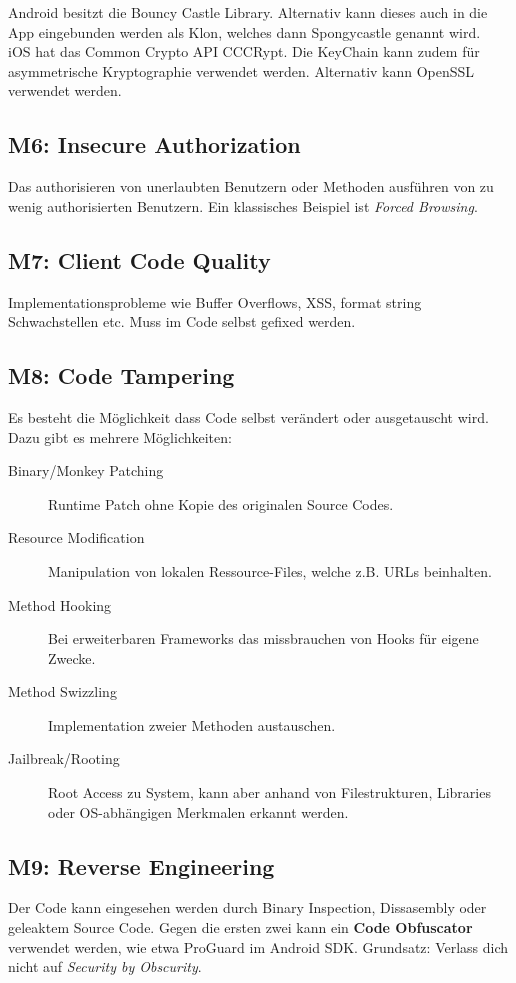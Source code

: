 Android besitzt die Bouncy Castle Library. Alternativ kann dieses auch in die App eingebunden werden als Klon, welches dann Spongycastle genannt wird.\\

iOS hat das Common Crypto API CCCRypt. Die KeyChain kann zudem für asymmetrische Kryptographie verwendet werden. Alternativ kann OpenSSL verwendet werden.

\subsection{M6: Insecure Authorization}
Das authorisieren von unerlaubten Benutzern oder Methoden ausführen von zu wenig authorisierten Benutzern. Ein klassisches Beispiel ist \textit{Forced Browsing}.

\subsection{M7: Client Code Quality}
Implementationsprobleme wie Buffer Overflows, XSS, format string Schwachstellen etc. Muss im Code selbst gefixed werden.

\subsection{M8: Code Tampering}
Es besteht die Möglichkeit dass Code selbst verändert oder ausgetauscht wird. Dazu gibt es mehrere Möglichkeiten:

\begin{description}
	\item[Binary/Monkey Patching] Runtime Patch ohne Kopie des originalen Source Codes.
	\item[Resource Modification] Manipulation von lokalen Ressource-Files, welche z.B. URLs beinhalten.
	\item[Method Hooking] Bei erweiterbaren Frameworks das missbrauchen von Hooks für eigene Zwecke.
	\item[Method Swizzling] Implementation zweier Methoden austauschen.
	\item[Jailbreak/Rooting] Root Access zu System, kann aber anhand von Filestrukturen, Libraries oder OS-abhängigen Merkmalen erkannt werden.
\end{description}

\subsection{M9: Reverse Engineering}
Der Code kann eingesehen werden durch Binary Inspection, Dissasembly oder geleaktem Source Code. Gegen die ersten zwei kann ein \textbf{Code Obfuscator} verwendet werden, wie etwa ProGuard im Android SDK. Grundsatz: Verlass dich nicht auf \textit{Security by Obscurity}.

